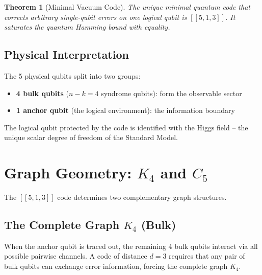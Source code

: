 \documentclass[11pt,a4paper]{article}
\newtheorem{theorem}{Theorem}[section]
\theoremstyle{definition}
\begin{document}
\begin{theorem}[Minimal Vacuum Code]
The unique minimal quantum code that corrects arbitrary single-qubit errors on one logical qubit is $[[5,1,3]]$. It saturates the quantum Hamming bound with equality.
\end{theorem}

\subsection{Physical Interpretation}

The 5 physical qubits split into two groups:
\begin{itemize}[nosep]
    \item \textbf{4 bulk qubits} ($n - k = 4$ syndrome qubits): form the observable sector
    \item \textbf{1 anchor qubit} (the logical environment): the information boundary
\end{itemize}
The logical qubit protected by the code is identified with the Higgs field -- the unique scalar degree of freedom of the Standard Model.

\section{Graph Geometry: $K_4$ and $C_5$}
\label{sec:graphs}

The $[[5,1,3]]$ code determines two complementary graph structures.

\subsection{The Complete Graph $K_4$ (Bulk)}

When the anchor qubit is traced out, the remaining 4 bulk qubits interact via all possible pairwise channels. A code of distance $d = 3$ requires that any pair of bulk qubits can exchange error information, forcing the complete graph $K_4$.
\end{document}
